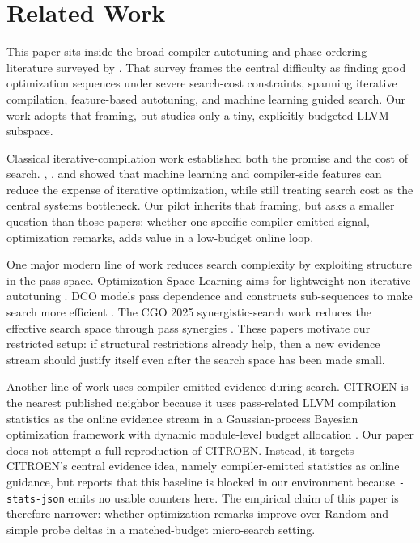 \documentclass{article}
\begin{document}
\section{Related Work}
\label{sec:related}

This paper sits inside the broad compiler autotuning and phase-ordering literature surveyed by \citet{ashouri2018survey}. That survey frames the central difficulty as finding good optimization sequences under severe search-cost constraints, spanning iterative compilation, feature-based autotuning, and machine learning guided search. Our work adopts that framing, but studies only a tiny, explicitly budgeted LLVM subspace.

Classical iterative-compilation work established both the promise and the cost of search. \citet{agakov2006focus}, \citet{cavazos2007counters}, and \citet{fursin2011milepost} showed that machine learning and compiler-side features can reduce the expense of iterative optimization, while still treating search cost as the central systems bottleneck. Our pilot inherits that framing, but asks a smaller question than those papers: whether one specific compiler-emitted signal, optimization remarks, adds value in a low-budget online loop.

One major modern line of work reduces search complexity by exploiting structure in the pass space. Optimization Space Learning aims for lightweight non-iterative autotuning \citep{burgstaller2024osl}. DCO models pass dependence and constructs sub-sequences to make search more efficient \citep{liu2024dco}. The CGO 2025 synergistic-search work reduces the effective search space through pass synergies \citep{pan2025synergistic}. These papers motivate our restricted setup: if structural restrictions already help, then a new evidence stream should justify itself even after the search space has been made small.

Another line of work uses compiler-emitted evidence during search. CITROEN is the nearest published neighbor because it uses pass-related LLVM compilation statistics as the online evidence stream in a Gaussian-process Bayesian optimization framework with dynamic module-level budget allocation \citep{zhao2025citroen}. Our paper does not attempt a full reproduction of CITROEN. Instead, it targets CITROEN's central evidence idea, namely compiler-emitted statistics as online guidance, but reports that this baseline is blocked in our environment because \texttt{-stats-json} emits no usable counters here. The empirical claim of this paper is therefore narrower: whether optimization remarks improve over Random and simple probe deltas in a matched-budget micro-search setting.
\end{document}
